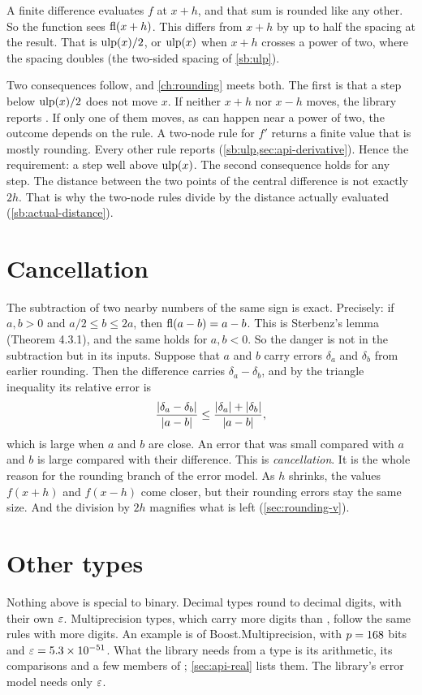 A finite difference evaluates $f$ at $x + h$, and that sum is rounded like any other. So the function sees
$\operatorname{fl}(x + h)$. This differs from $x + h$ by up to half the spacing at the result. That is $\operatorname{ulp}(x) / 2$, or $\operatorname{ulp}(x)$
when $x + h$ crosses a power of two, where the spacing doubles (the two-sided spacing of \cref{sb:ulp}).

Two consequences follow, and \cref{ch:rounding} meets both. The first is that a step below $\operatorname{ulp}(x) / 2$ does not
move $x$. If neither $x + h$ nor $x - h$ moves, the library reports . If only one of them
moves, as can happen near a power of two, the outcome depends on the rule. A two-node rule for $f'$ returns a finite
value that is mostly rounding. Every other rule reports  (\cref{sb:ulp,sec:api-derivative}). Hence
the requirement: a step well above $\operatorname{ulp}(x)$. The second consequence holds for any step. The distance between the two
points of the central difference is not exactly $2h$. That is why the two-node rules divide by the distance actually
evaluated (\cref{sb:actual-distance}).

\section{Cancellation}\label{sec:fp-cancellation}

The subtraction of two nearby numbers of the same sign is exact. Precisely: if $a, b > 0$ and $a / 2 \le b \le 2a$,
then $\operatorname{fl}(a - b) = a - b$. This is Sterbenz's lemma (Theorem 4.3.1), and the same holds for
$a, b < 0$.\cite{sterbenz1974} So the danger is not in the subtraction but in its inputs. Suppose that $a$ and $b$
carry errors $\delta_a$ and $\delta_b$ from earlier rounding. Then the difference carries $\delta_a - \delta_b$, and
by the triangle inequality its relative error is
\begin{equation*}
  \frac{\lvert \delta_a - \delta_b \rvert}{\lvert a - b \rvert} \le \frac{\lvert \delta_a \rvert + \lvert \delta_b \rvert}{\lvert a - b \rvert},
\end{equation*}
which is large when $a$ and $b$ are close. An error that was small compared with $a$ and $b$ is large compared with
their difference. This is \emph{cancellation}. It is the whole reason for the rounding branch of the error model. As
$h$ shrinks, the values $f(x + h)$ and $f(x - h)$ come closer, but their rounding errors stay the same size. And the
division by $2h$ magnifies what is left (\cref{sec:rounding-v}).

\section{Other types}\label{sec:fp-types}

Nothing above is special to binary. Decimal types round to decimal digits, with their own $\varepsilon$. Multiprecision
types, which carry more digits than , follow the same rules with more digits. An example is
 of Boost.Multiprecision, with $p = \num{168}$ bits and
$\varepsilon = \num{5.3e-51}$. What the library needs from a type is its arithmetic, its comparisons and a
few members of ; \cref{sec:api-real} lists them. The library's error model needs only
$\varepsilon$.
